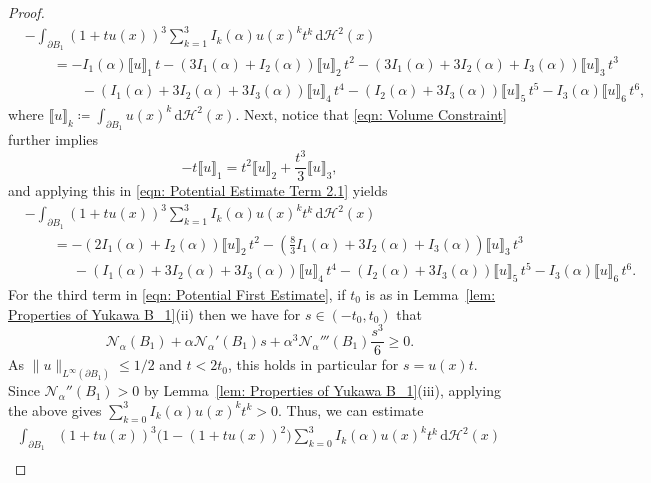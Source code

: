 \documentclass[a4paper,11pt,reqno]{amsart}
\numberwithin{equation}{section}
\theoremstyle{remark}
\theoremstyle{definition}
\newcommand{\lbr}{\llbracket}
\newcommand{\rbr}{\rrbracket}
\newcommand{\dd}{\,\mathrm{d}}
\newcommand{\defeq}{\coloneqq}
\newcommand{\nl}{\mathcal{N}_{\alpha}}
\renewcommand{\leq}{\leqslant}
\renewcommand{\geq}{\geqslant}
\begin{document}
\begin{proof}
	\begin{equation}\label{eqn: Potential Estimate Term 2.1}
	\begin{aligned}
		&-\int_{\partial B_1}(1+tu(x))^3\sum_{k=1}^3I_k(\alpha)u(x)^kt^k\dd \mathcal{H}^2(x) \\
		&\qquad= -I_1(\alpha)\lbr u\rbr_1\,t-\left(3I_1(\alpha)+I_2(\alpha)\right)\lbr u\rbr_2\,t^2-\left(3I_1(\alpha)+3I_2(\alpha)+I_3(\alpha)\right)\lbr u\rbr_3\,t^3\\
		&\qquad\qquad -\left(I_1(\alpha)+3I_2(\alpha)+3I_3(\alpha)\right)\lbr u\rbr_4\,t^4-\left(I_2(\alpha)+3I_3(\alpha)\right)\lbr u\rbr_5\,t^5-I_3(\alpha)\lbr u\rbr_6\,t^6,
	\end{aligned}
	\end{equation}
where $\lbr u\rbr_k \defeq \int_{\partial B_1} u(x)^k \dd \mathcal{H}^2(x)$.
Next, notice that \eqref{eqn: Volume Constraint} further implies
	\begin{equation}\label{eqn: Volume Constraint Reduction}
		-t\lbr u\rbr_1 = t^2\lbr u\rbr_2+\frac{t^3}{3}\lbr u\rbr_3, 
	\end{equation}
and applying this in \eqref{eqn: Potential Estimate Term 2.1} yields
	\begin{equation}\label{eqn: Potential Estimate Term 2.2}
	\begin{aligned}
		&-\int_{\partial B_1}(1+tu(x))^3\sum_{k=1}^3I_k(\alpha)u(x)^kt^k\dd \mathcal{H}^2(x) \\
		&\qquad = -\left(2I_1(\alpha)+I_2(\alpha)\right)\lbr u\rbr_2\,t^2-\left(\frac{8}{3}I_1(\alpha)+3I_2(\alpha)+I_3(\alpha)\right)\lbr u\rbr_3\,t^3\\
		&\ \ \quad\qquad -\left(I_1(\alpha)+3I_2(\alpha)+3I_3(\alpha)\right)\lbr u\rbr_4\,t^4-\left(I_2(\alpha)+3I_3(\alpha)\right)\lbr u\rbr_5\,t^5-I_3(\alpha)\lbr u\rbr_6\,t^6.
	\end{aligned}
	\end{equation}
For the third term in \eqref{eqn: Potential First Estimate}, if $t_0$ is as in Lemma~\ref{lem: Properties of Yukawa B_1}(ii) then we  have for $s\in (-t_0, t_0)$ that
	\[
		\nl(B_1)+\alpha \nl'(B_1)s+\alpha^3\nl'''(B_1)\frac{s^3}{6}\geq 0.
	\]
As $\|u\|_{L^{\infty}(\partial B_1)}\leq 1/2$ and $t<2t_0$, this holds in particular for $s = u(x)t$. Since $\nl''(B_1)>0$ by Lemma~\ref{lem: Properties of Yukawa B_1}(iii), applying the above gives $\sum_{k=0}^3I_k(\alpha)u(x)^kt^k>0$. Thus, we can estimate
	\begin{align*}
		\int_{\partial B_1}&(1+tu(x))^3\big(1-(1+tu(x))^2\big)\sum_{k=0}^3 I_k(\alpha)u(x)^kt^k\dd\mathcal{H}^2(x)  \\

\end{align*}
\end{proof}
\end{document}
